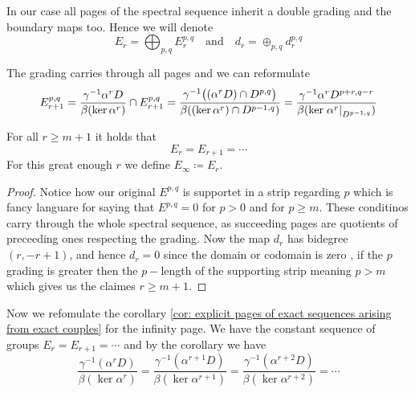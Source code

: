 \begin{definition}
	In our case all pages of the spectral sequence inherit a double grading and the boundary maps too. Hence we will denote
	\begin{equation*}
		E_r=\bigoplus_{p,q}E_r^{p,q}\quad \text{and} \quad d_r=\oplus_{p,q}d_r^{p,q}
	\end{equation*}
\end{definition}


\begin{corollary}\label{cor: explicit pages of exact sequences arising from exact couples with grading}
	The grading carries through all pages and we can reformulate
	\begin{equation*}
		E^{p,q}_{r+1}=\frac{\gamma^{-1}\alpha^rD}{\beta(\ker \alpha^r)}\cap E^{p,q}_{r+1}
		=\frac{\gamma^{-1}\big((\alpha^rD)\cap D^{p,q}\big)}{\beta((\ker \alpha^r)\cap D^{p-1,q})}
		=\frac{\gamma^{-1}\alpha^rD^{p+r,q-r}}{\beta(\ker \left.\alpha^r\right|_{D^{p-1,q}})}
	\end{equation*}
\end{corollary}
\begin{corollary}
	For all $r\geq m+1$ it holds that
	\begin{equation*}
		E_{r}=E_{r+1}=\cdots
	\end{equation*} For this great enough $r$ we define $E_{\infty}\coloneq E_{r}$.
\end{corollary}
\begin{proof}
	Notice how our original $E^{p,q}$ is supportet in a strip regarding $p$ which is fancy languare for saying that $E^{p,q}=0$ for $p>0$ and for $p\geq m$. These conditinos carry through the whole spectral sequence, as succeeding pages are quotients of preceeding ones respecting the grading. Now the map $d_r$ has bidegree $(r,-r+1)$, and hence $d_r=0$ since the domain or codomain is zero , if the $p$ grading is greater then the $p-$length of the supporting strip meaning $p>m$ which gives us the claimes $r\geq m+1$.
\end{proof}
Now we refomulate the corollary \ref{cor: explicit pages of exact sequences arising from exact couples} for the infinity page. We have the constant sequence of groups $E_r=E_{r+1}=\cdots$ and by the corollary we have
\begin{equation*}
	\frac{\gamma^{-1}(\alpha^rD)}{\beta(\ker{\alpha^r})}=\frac{\gamma^{-1}(\alpha^{r+1}D)}{\beta(\ker{\alpha^{r+1}})}=\frac{\gamma^{-1}(\alpha^{r+2}D)}{\beta(\ker{\alpha^{r+2}})}=\cdots
\end{equation*}
